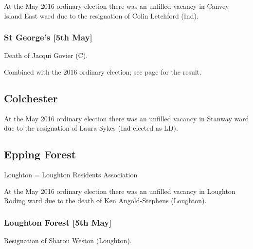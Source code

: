 \documentclass[a4paper,openany]{book}
\begin{document}
\begin{resultsiii}
At the May 2016 ordinary election there was an unfilled vacancy in Canvey Island East ward due to the resignation of Colin Letchford (Ind).

\subsubsection*{St George's \hspace*{\fill}\nolinebreak[1]%
\enspace\hspace*{\fill}
[5th May]}


Death of Jacqui Govier (C).

Combined with the 2016 ordinary election; see page \pageref{StGeorgesCastlePoint} for the result.

\subsection*{Colchester}

At the May 2016 ordinary election there was an unfilled vacancy in Stanway ward due to the resignation of Laura Sykes (Ind elected as LD).

\subsection*{Epping Forest}

Loughton = Loughton Residents Association

At the May 2016 ordinary election there was an unfilled vacancy in Loughton Roding ward due to the death of Ken Angold-Stephens (Loughton).

\subsubsection*{Loughton Forest \hspace*{\fill}\nolinebreak[1]%
\enspace\hspace*{\fill}
[5th May]}


Resignation of Sharon Weston (Loughton).


\end{resultsiii}
\end{document}
